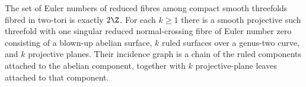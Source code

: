 \begin{proposition}\hypertarget{tag-01CX}{}\label{cdp:st:C.2.UN.2}

The set of Euler numbers of reduced fibres among compact smooth
threefolds fibred in two-tori is exactly $2\Z$. For each $k\ge1$
there is a smooth projective such threefold with one singular reduced
normal-crossing fibre of Euler number zero consisting of a blown-up
abelian surface, $k$ ruled surfaces over a genus-two curve, and $k$
projective planes. Their incidence graph is a chain of the ruled
components attached to the abelian component, together with $k$
projective-plane leaves attached to that component.
\end{proposition}


